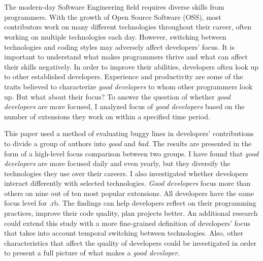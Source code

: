 \chapter{\abstractname}

The modern-day Software Engineering field requires diverse skills from programmers. With the growth of Open Source Software (OSS), most contributors work on many different technologies throughout their career, often working on multiple technologies each day. However, switching between technologies and coding styles may adversely affect developers’ focus. It is important to understand what makes programmers thrive and what can affect their skills negatively. In order to improve their abilities, developers often look up to other established developers. Experience and productivity are some of the traits believed to characterize \textit{good developers} to whom other programmers look up. But what about their focus? To answer the question of whether \textit{good developers} are more focused, I analyzed focus of \textit{good developers} based on the number of extensions they work on within a specified time period. \par

This paper used a method of evaluating buggy lines in developers’ contributions to divide a group of authors into \textit{good} and \textit{bad}. The results are presented in the form of a high-level focus comparison between two groups. I have found that \textit{good developers} are more focused daily and even yearly, but they diversify the technologies they use over their careers. I also investigated whether developers interact differently with selected technologies. \textit{Good developers} focus more than others on nine out of ten most popular extensions. All developers have the same focus level for .rb. 
The findings can help developers reflect on their programming practices, improve their code quality, plan projects better. An additional research could extend this study with a more fine-grained definition of developers’ focus that takes into account temporal switching between technologies. Also, other characteristics that affect the quality of developers could be investigated in order to present a full picture of what makes a \textit{good developer}.


\makeatletter
{}
{\renewcommand{\abstractname}{Abstract}}
\makeatother


